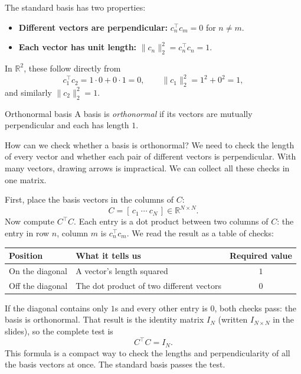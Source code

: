 \documentclass[a4paper,12pt,oneside]{report}
\begin{document}
The standard basis has two properties:
\begin{itemize}
  \item \textbf{Different vectors are perpendicular:}
        $c_n^\top c_m=0$ for $n\ne m$.
  \item \textbf{Each vector has unit length:}
        $\lVert c_n\rVert_2^2=c_n^\top c_n=1$.
\end{itemize}
In $\mathbb{R}^{2}$, these follow directly from
\[
  c_1^\top c_2=1\cdot0+0\cdot1=0,\qquad
  \lVert c_1\rVert_2^2=1^2+0^2=1,
\]
and similarly $\lVert c_2\rVert_2^2=1$.

\begin{frameddefn}{Orthonormal basis}\label{def:orthonormal-basis}
A basis is \emph{orthonormal} if its vectors are mutually perpendicular
and each has length $1$.
\end{frameddefn}

How can we check whether a basis is orthonormal? We need to check the
length of every vector and whether each pair of different vectors is
perpendicular. With many vectors, drawing arrows is impractical. We
can collect all these checks in one matrix.

First, place the basis vectors in the columns of $C$:
\[
  C=[\,c_1\ \cdots\ c_N\,]
  \in\mathbb{R}^{N\times N}.
\]
Now compute $C^\top C$. Each entry is a dot product between two columns
of $C$: the entry in row $n$, column $m$ is $c_n^\top c_m$.
We read the result as a table of checks:
\begin{center}
\begin{tabularx}{\linewidth}{@{}lXc@{}}
\toprule
\textbf{Position} & \textbf{What it tells us} & \textbf{Required value} \\
\midrule
On the diagonal & A vector's length squared & $1$ \\
Off the diagonal & The dot product of two different vectors & $0$ \\
\bottomrule
\end{tabularx}
\end{center}

If the diagonal contains only $1$s and every other entry is $0$, both
checks pass: the basis is orthonormal. That result is the identity
matrix $I_N$ (written $I_{N\times N}$ in the slides), so the complete test is
\[
  \boxed{C^\top C=I_N.}
\]
This formula is a compact way to check the lengths and perpendicularity
of all the basis vectors at once. The standard basis passes the test.
\end{document}
